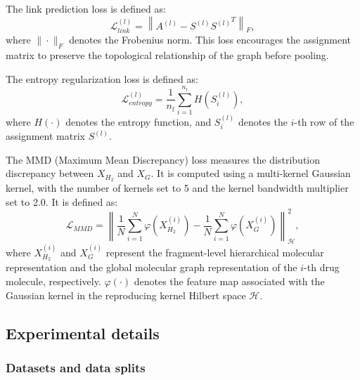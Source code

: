 \documentclass[pdflatex,sn-mathphys-num]{sn-jnl}%
\theoremstyle{thmstyleone}%
\theoremstyle{thmstyletwo}%
\theoremstyle{thmstylethree}%
\begin{document}
The link prediction loss is defined as:
\begin{equation}
\mathcal{L}_{link}^{(l)}=\left\|A^{(l)}-S^{(l)}{S^{(l)}}^T\right\|_F,
\end{equation}
where $\|\cdot\|_F$ denotes the Frobenius norm. This loss encourages the assignment matrix to preserve the topological relationship of the graph before pooling.

The entropy regularization loss is defined as:
\begin{equation}
\mathcal{L}_{entropy}^{(l)}=\frac{1}{n_l}\sum_{i=1}^{n_l}H\left(S_i^{(l)}\right),
\end{equation}
where $H(\cdot)$ denotes the entropy function, and $S_i^{(l)}$ denotes the $i$-th row of the assignment matrix $S^{(l)}$.

The MMD (Maximum Mean Discrepancy) loss measures the distribution discrepancy between $X_{H_2}$ and $X_G$. It is computed using a multi-kernel Gaussian kernel, with the number of kernels set to 5 and the kernel bandwidth multiplier set to 2.0. It is defined as:
\begin{equation}
\mathcal{L}_{MMD}
=
\left\|
\frac{1}{N}\sum_{i=1}^{N}\varphi\left(X_{H_2}^{(i)}\right)
-
\frac{1}{N}\sum_{i=1}^{N}\varphi\left(X_G^{(i)}\right)
\right\|_{\mathcal{H}}^{2},
\end{equation}
where $X_{H_2}^{(i)}$ and $X_G^{(i)}$ represent the fragment-level hierarchical molecular representation and the global molecular graph representation of the $i$-th drug molecule, respectively. $\varphi(\cdot)$ denotes the feature map associated with the Gaussian kernel in the reproducing kernel Hilbert space $\mathcal{H}$. 

\subsection{Experimental details}

\subsubsection{Datasets and data splits}
\end{document}
